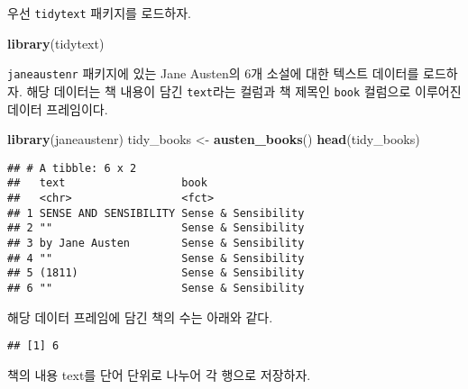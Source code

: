 \documentclass[]{book}
\newenvironment{Shaded}{\begin{snugshade}}{\end{snugshade}}
\newcommand{\KeywordTok}[1]{\textcolor[rgb]{0.13,0.29,0.53}{\textbf{#1}}}
\newcommand{\NormalTok}[1]{#1}
\newcommand{\OperatorTok}[1]{\textcolor[rgb]{0.81,0.36,0.00}{\textbf{#1}}}
\newcommand{\StringTok}[1]{\textcolor[rgb]{0.31,0.60,0.02}{#1}}
\begin{document}
우선 \texttt{tidytext} 패키지를 로드하자.

\begin{Shaded}
\begin{Highlighting}[]
\KeywordTok{library}\NormalTok{(tidytext)}
\end{Highlighting}
\end{Shaded}

\texttt{janeaustenr} 패키지에 있는 Jane Austen의 6개 소설에 대한 텍스트 데이터를 로드하자. 해당 데이터는 책 내용이 담긴 \texttt{text}라는 컬럼과 책 제목인 \texttt{book} 컬럼으로 이루어진 데이터 프레임이다.

\begin{Shaded}
\begin{Highlighting}[]
\KeywordTok{library}\NormalTok{(janeaustenr)}
\NormalTok{tidy_books <-}\StringTok{ }\KeywordTok{austen_books}\NormalTok{()}
\KeywordTok{head}\NormalTok{(tidy_books)}
\end{Highlighting}
\end{Shaded}

\begin{verbatim}
## # A tibble: 6 x 2
##   text                  book               
##   <chr>                 <fct>              
## 1 SENSE AND SENSIBILITY Sense & Sensibility
## 2 ""                    Sense & Sensibility
## 3 by Jane Austen        Sense & Sensibility
## 4 ""                    Sense & Sensibility
## 5 (1811)                Sense & Sensibility
## 6 ""                    Sense & Sensibility
\end{verbatim}

해당 데이터 프레임에 담긴 책의 수는 아래와 같다.

\begin{Shaded}
\end{Shaded}

\begin{verbatim}
## [1] 6
\end{verbatim}

책의 내용 text를 단어 단위로 나누어 각 행으로 저장하자.

\begin{Shaded}
\end{Shaded}
\end{document}
